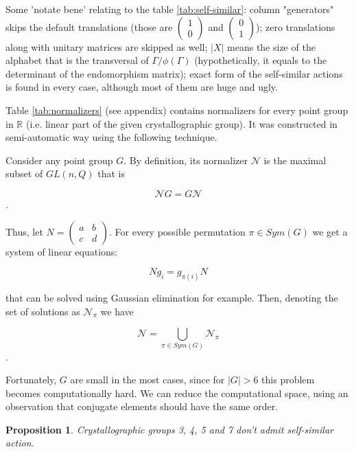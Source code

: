 \documentclass[a4paper,12pt]{amsart}
\newtheorem{proposition}{Proposition}
\begin{document}
	Some 'notate bene' relating to the table \ref{tab:self-similar}: column "generators" skips the default translations (those are $\begin{pmatrix}1 \\ 0\end{pmatrix}$ and $\begin{pmatrix}0 \\ 1\end{pmatrix}$); zero translations along with unitary matrices are skipped as well; $|X|$ means the size of the alphabet that is the transversal of $\Gamma / \phi(\Gamma)$ (hypothetically, it equals to the determinant of the endomorphism matrix); exact form of the self-similar actions is found in every case, although most of them are huge and ugly.  
	
	Table \ref{tab:normalizers} (see appendix) contains normalizers for every point group in $\mathbb{R}$ (i.e. linear part of the given crystallographic group). It was constructed in semi-automatic way using the following technique. 
	
	Consider any point group $G$. By definition, its normalizer $\mathcal{N}$ is the maximal subset of $GL(n, Q)$ that is 
	
	$$\mathcal{N}G = G\mathcal{N}$$.
	
	Thus, let $N = \begin{pmatrix}a & b \\ c & d \end{pmatrix}$. For every possible permutation $\pi \in Sym(G)$ we get a system of linear equations: 
	
	\begin{equation} \label{eq:eq2}
		Ng_i = g_{\pi(i)}N
	\end{equation}
	
	that can be solved using Gaussian elimination for example. Then, denoting the set of solutions as $\mathcal{N}_\pi$ we have
	
	$$\mathcal{N} = \bigcup_{\pi \in Sym(G)}\mathcal{N}_\pi$$.
	
	Fortunately, $G$ are small in the most cases, since for $|G| > 6$ this problem becomes computationally hard. We can reduce the computational space, using an observation that conjugate elements should have the same order. 
	
	
	\begin{proposition} \label{prop:1}
		Crystallographic groups 3, 4, 5 and 7 don't admit self-similar action. 
	\end{proposition}	
\end{document}
